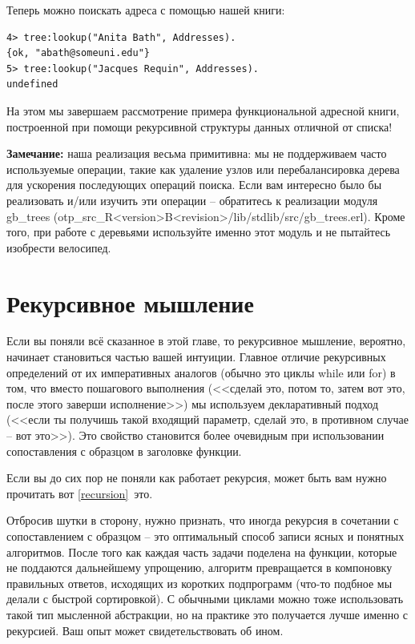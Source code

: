 \documentclass[a4paper,12pt]{report}
\newcommand{\ops}{\colorbox{lgreen}}
\begin{document}
Теперь можно поискать адреса с помощью нашей книги:
\begin{lstlisting}[style=erlang]
4> tree:lookup("Anita Bath", Addresses).
{ok, "abath@someuni.edu"}
5> tree:lookup("Jacques Requin", Addresses).
undefined
\end{lstlisting}

На этом мы завершаем рассмотрение примера функциональной адресной книги, построенной при помощи рекурсивной структуры данных отличной от списка!\\
\colorbox{lgray}
{
    \begin{minipage}{\linewidth}
\textbf{Замечание:} наша реализация весьма примитивна: мы не поддерживаем часто используемые операции, такие как удаление узлов или перебалансировка дерева для ускорения последующих операций поиска. Если вам интересно было бы реализовать и/или изучить эти операции \--- обратитесь к реализации модуля \ops{gb\_trees} (\ops{otp\_src\_R<version>B<revision>/lib/stdlib/src/gb\_trees.erl}). Кроме того, при работе с деревьями используйте именно этот модуль и не пытайтесь изобрести велосипед.
    \end{minipage}
}
\section{Рекурсивное мышление}
Если вы поняли всё сказанное в этой главе, то рекурсивное мышление, вероятно, начинает становиться частью вашей интуиции. Главное отличие рекурсивных определений от их императивных аналогов (обычно это циклы while или for) в том, что вместо пошагового выполнения (<<сделай это, потом то, затем вот это, после этого заверши исполнение>>) мы используем декларативный подход (<<если ты получишь такой входящий параметр, сделай это, в противном случае \--- вот это>>). Это свойство становится более очевидным при использовании сопоставления с образцом в заголовке функции.

Если вы до сих пор не поняли как работает рекурсия, может быть вам нужно прочитать вот \ref{recursion}{~это}.

Отбросив шутки в сторону, нужно признать, что иногда рекурсия в сочетании с сопоставлением с образцом \--- это оптимальный способ записи ясных и понятных алгоритмов. После того как каждая часть задачи поделена на функции, которые не поддаются дальнейшему упрощению, алгоритм превращается в компоновку правильных ответов, исходящих из коротких подпрограмм (что\--то подбное мы делали с быстрой сортировкой). С обычными циклами можно тоже использовать такой тип мысленной абстракции, но на практике это получается лучше именно с рекурсией. Ваш опыт может свидетельствовать об ином.
\end{document}
